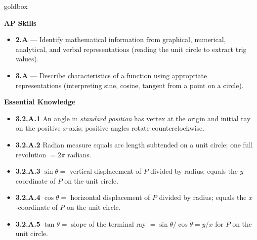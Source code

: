 \documentclass[10pt]{article}
\begin{document}
\begin{skillbox}{goldbox}
  \begin{minipage}[t]{0.46\linewidth}\vspace{0pt}
    \textbf{AP Skills}
    \begin{itemize}[leftmargin=1.2em, itemsep=1pt]
      \item \textbf{2.A} --- Identify mathematical information from graphical, numerical,
            analytical, and verbal representations (reading the unit circle to extract
            trig values).
      \item \textbf{3.A} --- Describe characteristics of a function using appropriate
            representations (interpreting sine, cosine, tangent from a point on a circle).
    \end{itemize}
  \end{minipage}
  \hfill
  \begin{minipage}[t]{0.50\linewidth}\vspace{0pt}
    \textbf{Essential Knowledge}
    \begin{itemize}[leftmargin=1.2em, itemsep=1pt]
      \item \textbf{3.2.A.1} An angle in \textit{standard position} has vertex at the origin and
            initial ray on the positive $x$-axis; positive angles rotate counterclockwise.
      \item \textbf{3.2.A.2} Radian measure equals arc length subtended on a unit circle;
            one full revolution $= 2\pi$ radians.
      \item \textbf{3.2.A.3} $\sin\theta =$ vertical displacement of $P$ divided by radius;
            equals the $y$-coordinate of $P$ on the unit circle.
      \item \textbf{3.2.A.4} $\cos\theta =$ horizontal displacement of $P$ divided by radius;
            equals the $x$-coordinate of $P$ on the unit circle.
      \item \textbf{3.2.A.5} $\tan\theta =$ slope of the terminal ray $= \sin\theta/\cos\theta
            = y/x$ for $P$ on the unit circle.
    \end{itemize}
  \end{minipage}
\end{skillbox}

\vspace{6pt}
\end{document}
